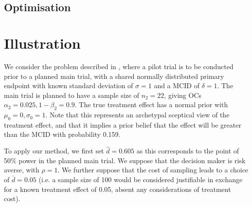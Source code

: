 \documentclass[sagev]{sagej}
\begin{document}
\subsection{Optimisation}\label{sec:optimisation}



\section{Illustration}

We consider the problem described in \cite{Stallard2012}, where a pilot trial is to be conducted prior to a planned main trial, with a shared normally distributed primary endpoint with known standard deviation of $\sigma = 1$ and a MCID of $\delta = 1$. The main trial is planned to have a sample size of $n_2 = 22$, giving OCs $\alpha_2 = 0.025, 1 - \beta_2 = 0.9$. The true treatment effect has a normal prior with $\mu_0 = 0, \sigma_0 = 1$. Note that this represents an archetypal sceptical view of the treatment effect, and that it implies a prior belief that the effect will be greater than the MCID with probability 0.159.


To apply our method, we first set $\hat{d} = 0.605$ as this corresponds to the point of 50\% power in the planned main trial. We suppose that the decision maker is risk averse, with $\rho = 1$. We further suppose that the cost of sampling leads to a choice of $\bar{d} = 0.05$ (i.e. a sample size of 100 would be considered justifiable in exchange for a known treatment effect of 0.05, absent any considerations of treatment cost).
\end{document}
